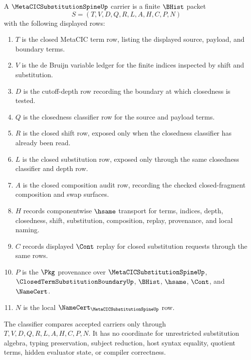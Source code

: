 \begin{definition}
\label{def:metacic-substitution-spine-carrier}
A $\MetaCICSubstitutionSpineUp$ carrier is a finite $\BHist$ packet
$$
S=(T,V,D,Q,R,L,A,H,C,P,N)
$$
with the following displayed rows:
\begin{enumerate}
\item $T$ is the closed MetaCIC term row, listing the displayed source, payload, and boundary terms.
\item $V$ is the de Bruijn variable ledger for the finite indices inspected by shift and substitution.
\item $D$ is the cutoff-depth row recording the boundary at which closedness is tested.
\item $Q$ is the closedness classifier row for the source and payload terms.
\item $R$ is the closed shift row, exposed only when the closedness classifier has already been read.
\item $L$ is the closed substitution row, exposed only through the same closedness classifier and depth row.
\item $A$ is the closed composition audit row, recording the checked closed-fragment composition and swap surfaces.
\item $H$ records componentwise $\hsame$ transport for terms, indices, depth, closedness, shift, substitution, composition, replay, provenance, and local naming.
\item $C$ records displayed $\Cont$ replay for closed substitution requests through the same rows.
\item $P$ is the $\Pkg$ provenance over $\MetaCICSubstitutionSpineUp$, $\ClosedTermSubstitutionBoundaryUp$, $\BHist$, $\hsame$, $\Cont$, and $\NameCert$.
\item $N$ is the local $\NameCert_{\MetaCICSubstitutionSpineUp}$ row.
\end{enumerate}
The classifier compares accepted carriers only through $T,V,D,Q,R,L,A,H,C,P,N$. It has no coordinate for unrestricted substitution algebra, typing preservation, subject reduction, host syntax equality, quotient terms, hidden evaluator state, or compiler correctness.
\end{definition}

